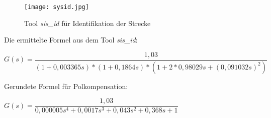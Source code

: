 \begin{figure}[h]
	\begin{center}
		\texttt{[image: sysid.jpg]}
		\caption{Tool \textit{sis\_id} für Identifikation der Strecke}
       \label{pic_sis_id}
	\end{center} 
\end{figure}

Die ermittelte Formel aus dem Tool \textit{sis\_id}: 

$ G(s) = \dfrac{1,03}{(1 + 0,003365s) * (1 + 0,1864s) * (1 + 2*0,98029s + (0,091032s)^{2}) }$

Gerundete Formel für Polkompensation:

$ G(s) =  \dfrac{1,03}{0,000005s^{4} + 0,0017s^{3	} + 0,043s^{2} + 0,368s + 1 } $
